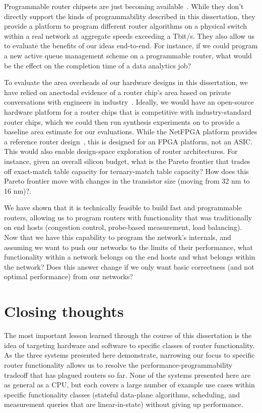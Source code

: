 Programmable router chipsets are just becoming available~\cite{tofino}. While
they don't directly support the kinds of programmability described in this
dissertation, they provide a platform to program different router algorithms on
a physical switch within a real network at aggregate speeds exceeding a Tbit/s.
They also allow us to evaluate the benefits of our ideas end-to-end. For
instance, if we could program a new active queue management scheme on a
programmable router, what would be the effect on the completion time of a
data analytics job?

 To evaluate the area
overheads of our hardware designs in this dissertation, we have relied on
anectodal evidence of a router chip's area based on private conversations with
engineers in industry~\cite{gibb_parsing}. Ideally, we would have an
open-source hardware platform for a router chips that is competitive with
industry-standard router chips, which we could then run synthesis experiments
on to provide a baseline area estimate for our evaluations. While the NetFPGA
platform provides a reference router design~\cite{netfpga}, this is designed
for an FPGA platform, not an ASIC. This would also enable design-space
exploration of router architectures. For instance, given an overall silicon
budget, what is the Pareto frontier that trades off exact-match table capacity
for ternary-match table capacity? How does this Pareto frontier move with
changes in the transistor size (\eg moving from 32 nm to 16 nm)?.

 We have shown
that it is technically feasible to build fast and programmable routers,
allowing us to program routers with functionality that was traditionally on end
hosts (\eg congestion control, probe-based measurement, load balancing). Now
that we have this capability to program the network's internals, and assuming
we want to push our networks to the limits of their performance, what
functionality within a network belongs on the end hosts and what belongs within
the network?  Does this answer change if we only want basic correctness (and
not optimal performance) from our networks?

\section{Closing thoughts}
The most important lesson learned through the course of this dissertation is
the idea of targeting hardware and software to specific classes of router
functionality. As the three systems presented here demonstrate, narrowing our
focus to specific router functionality allows us to resolve the
performance-programmability tradeoff that has plagued routers so far. None of
the systems presented here are as general as a CPU, but each covers a large
number of example use cases within specific functionality classes (stateful
data-plane algorithms, scheduling, and measurement queries that are
linear-in-state) without giving up performance.

